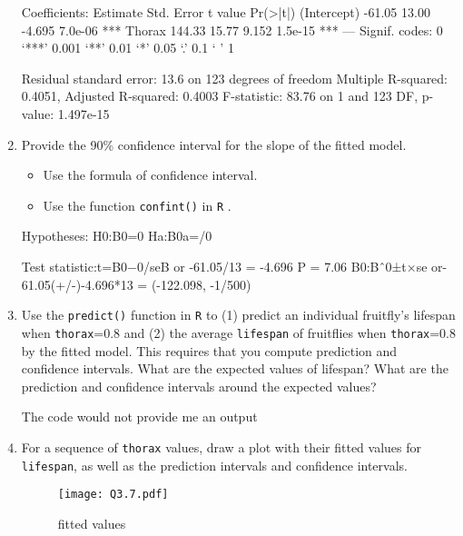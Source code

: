 \documentclass[12pt,letterpaper]{article}
\begin{document}
\begin{enumerate}
Coefficients:
Estimate Std. Error t value Pr(>|t|)    
(Intercept)   -61.05      13.00  -4.695  7.0e-06 ***
Thorax        144.33      15.77   9.152  1.5e-15 ***
---
Signif. codes:  0 ‘***’ 0.001 ‘**’ 0.01 ‘*’ 0.05 ‘.’ 0.1 ‘ ’ 1

Residual standard error: 13.6 on 123 degrees of freedom
Multiple R-squared:  0.4051,	Adjusted R-squared:  0.4003 
F-statistic: 83.76 on 1 and 123 DF,  p-value: 1.497e-15
	
\newpage
	\item
	
	Provide the 90\% confidence interval for the slope of the fitted model.
	
			\vspace{.5cm}
	\begin{itemize}
		\item
		Use the formula of confidence interval.		\vspace{.5cm}
		\item
		Use the function  \texttt{confint()}  in \texttt{R} .
	\end{itemize}
			\vspace{6cm}
			
Hypotheses:
H0:B0=0 
Ha:B0a=/0

Test statistic:t=B0−0/seB or -61.05/13 = -4.696
P = 7.06
B0:Bˆ0±t×se or-61.05(+/-)-4.696*13 = (-122.098, -1/500)

	

	\item Use the \texttt{predict()} function in \texttt{R} to (1) predict an individual fruitfly's lifespan when \texttt{thorax}=0.8 and (2) the average \texttt{lifespan} of fruitflies when \texttt{thorax}=0.8 by the fitted model. This requires that you compute prediction and confidence intervals. What are the expected values of lifespan? What are the prediction and confidence intervals around the expected values? 

	
	The code would not provide me an output 
			\vspace{6cm}
	\item	For a sequence of \texttt{thorax} values, draw a plot with their fitted values for \texttt{lifespan}, as well as the prediction intervals and confidence intervals.

	

\begin{figure}[htbp]
	\centerline{\texttt{[image: Q3.7.pdf]}}
	\caption{fitted values}
	\label{fig}
\end{figure}


\end{enumerate}
\end{document}
